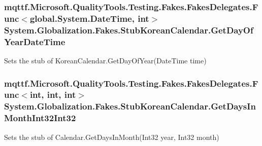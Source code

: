 \hypertarget{class_system_1_1_globalization_1_1_fakes_1_1_stub_korean_calendar_a9cbfba7e9b033278b320077ab12c7baa}{
\subsubsection[{Get\-Day\-Of\-Year\-Date\-Time}]{\setlength{\rightskip}{0pt plus 5cm}mqttf.\-Microsoft.\-Quality\-Tools.\-Testing.\-Fakes.\-Fakes\-Delegates.\-Func$<$global.\-System.\-Date\-Time, int$>$ System.\-Globalization.\-Fakes.\-Stub\-Korean\-Calendar.\-Get\-Day\-Of\-Year\-Date\-Time}}\label{class_system_1_1_globalization_1_1_fakes_1_1_stub_korean_calendar_a9cbfba7e9b033278b320077ab12c7baa}


Sets the stub of Korean\-Calendar.\-Get\-Day\-Of\-Year(\-Date\-Time time)

\hypertarget{class_system_1_1_globalization_1_1_fakes_1_1_stub_korean_calendar_a96bcde7ccaa3f3a82685b0eeef802916}{
\subsubsection[{Get\-Days\-In\-Month\-Int32\-Int32}]{\setlength{\rightskip}{0pt plus 5cm}mqttf.\-Microsoft.\-Quality\-Tools.\-Testing.\-Fakes.\-Fakes\-Delegates.\-Func$<$int, int, int$>$ System.\-Globalization.\-Fakes.\-Stub\-Korean\-Calendar.\-Get\-Days\-In\-Month\-Int32\-Int32}}\label{class_system_1_1_globalization_1_1_fakes_1_1_stub_korean_calendar_a96bcde7ccaa3f3a82685b0eeef802916}


Sets the stub of Calendar.\-Get\-Days\-In\-Month(\-Int32 year, Int32 month)

